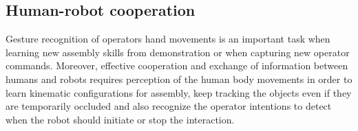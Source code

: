 

\subsection{Human-robot cooperation}

Gesture recognition of operators hand movements \cite{Oikonomidis2012,Gleeson2013} is an important task when learning new assembly skills from demonstration \cite{Nikolaidis2013} or when capturing new operator commands. Moreover, effective cooperation \cite{Adorno2011} and exchange of information between humans and robots \cite{Putz2014,Pandey2012} requires perception of the human body movements \cite{Roitberg2014} in order to learn kinematic configurations for assembly, keep tracking the objects even if they are temporarily occluded and also recognize the operator intentions to detect when the robot should initiate or stop the interaction.


%


